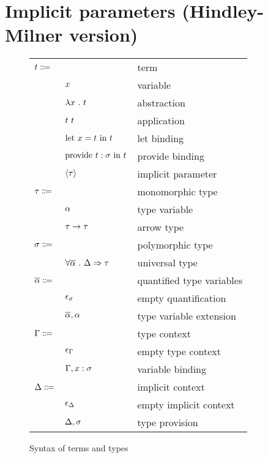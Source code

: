 \documentclass[acmlarge]{acmart}
\begin{document}
\section{Implicit parameters (Hindley-Milner version)}

  \begin{figure}
    \begin{mdframed}

      \begin{tabular}{l l l}
        $t \Coloneqq $ & & term \\
        & $x$ & variable \\
        & $\lambda x \ . \ t$ & abstraction \\
        & $t \ t$ & application \\
        & $\text{let } x = t \text{ in } t$ & let binding \\
        & $\text{provide } t : \sigma \text{ in } t$ & provide binding \\
        & $\left\langle \tau \right\rangle$ & implicit parameter \\
        $\tau \Coloneqq$ & & monomorphic type \\
        & $\alpha$ & type variable \\
        & $\tau \rightarrow \tau$ & arrow type \\
        $\sigma \Coloneqq$ & & polymorphic type \\
        & $\forall \overline{\alpha} \ . \ \Delta \Rightarrow \tau$ & universal type \\
        $\overline{\alpha} \Coloneqq$ & & quantified type variables \\
        & $\epsilon_{\sigma}$ & empty quantification \\
        & $\overline{\alpha}, {\alpha}$ & type variable extension \\
        $\Gamma \Coloneqq$ & & type context \\
        & $\epsilon_{\Gamma}$ & empty type context \\
        & $\Gamma, x : \sigma$ & variable binding \\
        $\Delta \Coloneqq$ & & implicit context \\
        & $\epsilon_{\Delta}$ & empty implicit context \\
        & $\Delta, \sigma$ & type provision
      \end{tabular}

      \caption{Syntax of terms and types}
      \label{fig:types_syntax}

    \end{mdframed}
  \end{figure}
\end{document}
